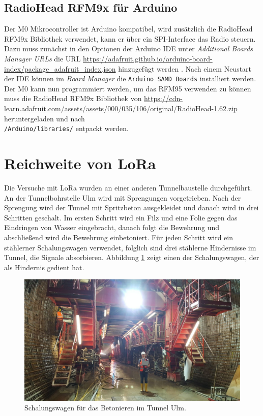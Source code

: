 \subsection{RadioHead RFM9x für Arduino}
Der M0 Mikrocontroller ist Arduino kompatibel, wird zusätzlich die RadioHead RFM9x Bibliothek verwendet, kann er über ein SPI-Interface das Radio steuern.
Dazu muss zunächst in den Optionen der Arduino IDE unter \textit{Additional Boards Manager URLs} die URL \url{https://adafruit.github.io/arduino-board-index/package_adafruit_index.json} hinzugefügt werden \cite{treece2016lora}.
Nach einem Neustart der IDE können im \textit{Board Manager} die \texttt{Arduino SAMD Boards} installiert werden. 
Der M0 kann nun programmiert werden, um das RFM95 verwenden zu können muss die RadioHead RFM9x Bibliothek von \url{https://cdn-learn.adafruit.com/assets/assets/000/035/106/original/RadioHead-1.62.zip} heruntergeladen und nach \\\texttt{/Arduino/libraries/} entpackt werden.

\section{Reichweite von LoRa}
Die Versuche mit LoRa wurden an einer anderen Tunnelbaustelle durchgeführt.
An der Tunnelbohrstelle Ulm wird mit Sprengungen vorgetrieben.
Nach der Sprengung wird der Tunnel mit Spritzbeton ausgekleidet und danach wird in drei Schritten geschalt. 
Im ersten Schritt wird ein Filz und eine Folie gegen das Eindringen von Wasser eingebracht, danach folgt die Bewehrung und abschließend wird die Bewehrung einbetoniert.
Für jeden Schritt wird ein stählerner Schalungswagen verwendet, folglich sind drei stählerne Hindernisse im Tunnel, die Signale absorbieren.
Abbildung \ref{fig:schalungswagen} zeigt einen der Schalungswagen, der als Hindernis gedient hat.

\begin{figure}[h]
  \centering
	\includegraphics[width=\textwidth]{images/schalungswagen.jpg}
  \caption{Schalungswagen für das Betonieren im Tunnel Ulm.}
  \label{fig:schalungswagen}
\end{figure}

